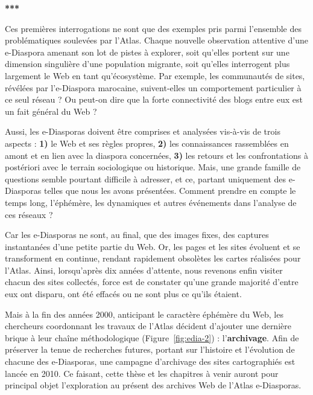 \documentclass[symmetric,justified,marginals=raggedouter]{tufte-book}
\begin{document}
\begin{center}
	\textbf{***}
\end{center}

\noindent Ces premières interrogations ne sont que des exemples pris parmi l'ensemble des problématiques soulevées par l'Atlas. Chaque nouvelle observation attentive d'une e-Diaspora amenant son lot de pistes à explorer, soit qu'elles portent sur une dimension singulière d'une population migrante, soit qu'elles interrogent plus largement le Web en tant qu'écosystème. Par exemple, les communautés de sites, révélées par l'e-Diaspora marocaine, suivent-elles un comportement particulier à ce seul réseau ? Ou peut-on dire que la forte connectivité des blogs entre eux est un fait général du Web ? 

Aussi, les e-Diasporas doivent être comprises et analysées vis-à-vis de trois aspects : \textbf{1)} le Web et ses règles propres, \textbf{2)} les connaissances rassemblées en amont et en lien avec la diaspora concernées, \textbf{3)} les retours et les confrontations à postériori avec le terrain sociologique ou historique. Mais, une grande famille de questions semble pourtant difficile à adresser, et ce, partant uniquement des e-Diasporas telles que nous les avons présentées. Comment prendre en compte le temps long, l'éphémère, les dynamiques et autres événements dans l'analyse de ces réseaux ? 

Car les e-Diasporas ne sont, au final, que des images fixes, des captures instantanées d'une petite partie du Web. Or, les pages et les sites évoluent et se transforment en continue, rendant rapidement obsolètes les cartes réalisées pour l'Atlas. Ainsi, lorsqu'après dix années d'attente, nous revenons enfin visiter chacun des sites collectés, force est de constater qu'une grande majorité d'entre eux ont disparu, ont été effacés ou ne sont plus ce qu'ils étaient.

Mais à la fin des années 2000, anticipant le caractère éphémère du Web, les chercheurs coordonnant les travaux de l'Atlas décident d'ajouter une dernière brique à leur chaîne méthodologique (Figure~\ref{fig:edia-2}) : l'\textbf{archivage}. Afin de préserver la tenue de recherches futures, portant sur l'histoire et l'évolution de chacune des e-Diasporas, une campagne d'archivage des sites cartographiés est lancée en 2010. Ce faisant, cette thèse et les chapitres à venir auront pour principal objet l'exploration au présent des archives Web de l'Atlas e-Diasporas.     

\end{document}

